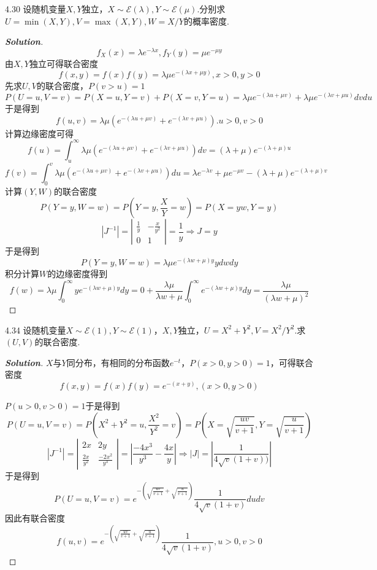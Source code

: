 \documentclass[10pt, a4paper, oneside]{ctexart}
\newenvironment{solution}{\begin{proof}[\bf Solution]}{\end{proof}}
\begin{document}
4.30 设随机变量$X,Y$独立，$X\sim \mathscr{E}(\lambda),Y\sim \mathscr{E}(\mu)$.分别求$U=\min (X,Y),V=\max(X,Y),W=X/Y$的概率密度.
\begin{solution}
    \[f_X(x)=\lambda e^{-\lambda x},f_Y(y)=\mu e^{-\mu y}\]
    由$X,Y$独立可得联合密度
\[f(x,y) = f(x)f(y) = \lambda \mu {e^{ - (\lambda x + \mu y)}},x > 0,y > 0\]
    先求$U,V$的联合密度，$P(v>u)=1$
\[P(U = u,V = v) = P(X = u,Y = v) + P(X = v,Y = u) = \lambda \mu {e^{ - (\lambda u + \mu v)}} + \lambda \mu {e^{ - (\lambda v + \mu u)}}dvdu\]
于是得到
\[f(u,v) = \lambda \mu ({e^{ - (\lambda u + \mu v)}} + {e^{ - (\lambda v + \mu u)}}).u > 0,v > 0\]
计算边缘密度可得
\[f(u) = \int_u^\infty  {\lambda \mu ({e^{ - (\lambda u + \mu v)}} + {e^{ - (\lambda v + \mu u)}})dv}  = (\lambda  + \mu ){e^{ - (\lambda  + \mu )u}}\]
\[f(v) = \int_0^v {\lambda \mu ({e^{ - (\lambda u + \mu v)}} + {e^{ - (\lambda v + \mu u)}})du}  = \lambda {e^{ - \lambda v}} + \mu {e^{ - \mu v}} - (\lambda  + \mu ){e^{ - (\lambda  + \mu )v}}\]
计算$(Y,W)$的联合密度
\[
P(Y=y,W=w)=P(Y=y,\frac{X}{Y}=w)=P(X=yw,Y=y)
\]
\[|{J^{ - 1}}| = \left| {\begin{array}{*{20}{c}}
  {\frac{1}{y}}&{ - \frac{x}{{{y^2}}}} \\ 
  0&1 
\end{array}} \right| = \frac{1}{y} \Rightarrow J = y\]
    于是得到
    \[P(Y = y,W = w) = \lambda \mu {e^{ - (\lambda w + \mu )y}}ydwdy\]
    积分计算$W$的边缘密度得到
    \[f(w) = \lambda \mu \int_0^\infty  {y{e^{ - (\lambda w + \mu )y}}} dy = 0 + \frac{{\lambda \mu }}{{\lambda w + \mu }}\int_0^\infty  {{e^{ - (\lambda w + \mu )y}}} dy = \frac{{\lambda \mu }}{{{{(\lambda w + \mu )}^2}}}\]
    
\end{solution}

4.34 设随机变量$X\sim \mathscr{E}(1),Y\sim \mathscr{E}(1)$，$X,Y$独立，$U=X^2+Y^2,V=X^2/Y^2$.求$(U,V)$的联合密度.
\begin{solution}
    $X$与$Y$同分布，有相同的分布函数$e^{-t}$，$P(x>0,y>0)=1$，可得联合密度
    \[f(x,y) = f(x)f(y) = {e^{ - (x + y)}},(x>0,y>0)\]
    
    $P(u>0,v>0)=1$于是得到
   \[P(U = u,V = v) = P({X^2} + {Y^2} = u,\frac{{{X^2}}}{{{Y^2}}} = v) = P(X =  \sqrt {\frac{{uv}}{{v + 1}}} ,Y =   \sqrt {\frac{u}{{v + 1}}} )\]
 \[|{J^{ - 1}}| = \left| {\begin{array}{*{20}{c}}
  {2x}&{2y} \\ 
  {\frac{{2x}}{{{y^2}}}}&{\frac{{ - 2{x^2}}}{{{y^3}}}} 
\end{array}} \right| = \left| {\frac{{ - 4{x^3}}}{{{y^3}}} - \frac{{4x}}{y}} \right| \Rightarrow |J| = \left| {\frac{1}{{4\sqrt{v}(1 + v))}}} \right|\]
于是得到
\[P(U = u,V = v) = {e^{ - (\sqrt {\frac{{uv}}{{v + 1}}}  + \sqrt {\frac{u}{{v + 1}}} )}}\frac{1}{{4\sqrt{v}(1 + v)}}dudv\]
因此有联合密度
\[f(u,v) = {e^{ - (\sqrt {\frac{{uv}}{{v + 1}}}  + \sqrt {\frac{u}{{v + 1}}} )}}\frac{1}{{4\sqrt{v}(1 + v)}},u > 0,v > 0\]
\end{solution}
\end{document}
